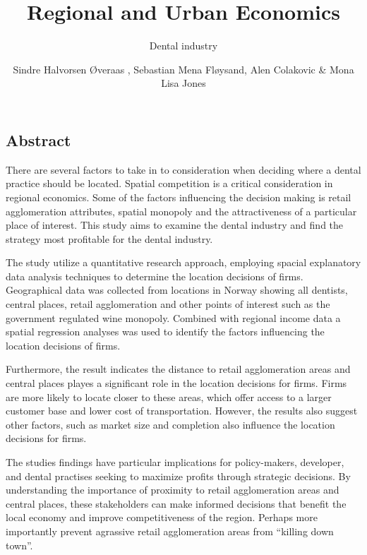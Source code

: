 \documentclass[
  10,
  a4paper,
]{article}
\title{Regional and Urban Economics}
\subtitle{Dental industry}
\author{Sindre Halvorsen Øveraas , Sebastian Mena Fløysand, Alen
Colakovic \& Mona Lisa Jones}
\date{}
\begin{document}
\maketitle
\ifdefined\Shaded\renewenvironment{Shaded}{\begin{tcolorbox}[borderline west={3pt}{0pt}{shadecolor}, enhanced, boxrule=0pt, frame hidden, interior hidden, breakable, sharp corners]}{\end{tcolorbox}}\fi

\hypertarget{abstract}{%
\subsection{Abstract}\label{abstract}}

There are several factors to take in to consideration when deciding
where a dental practice should be located. Spatial competition is a
critical consideration in regional economics. Some of the factors
influencing the decision making is retail agglomeration attributes,
spatial monopoly and the attractiveness of a particular place of
interest. This study aims to examine the dental industry and find the
strategy most profitable for the dental industry.

The study utilize a quantitative research approach, employing spacial
explanatory data analysis techniques to determine the location decisions
of firms. Geographical data was collected from locations in Norway
showing all dentists, central places, retail agglomeration and other
points of interest such as the government regulated wine monopoly.
Combined with regional income data a spatial regression analyses was
used to identify the factors influencing the location decisions of
firms.

Furthermore, the result indicates the distance to retail agglomeration
areas and central places playes a significant role in the location
decisions for firms. Firms are more likely to locate closer to these
areas, which offer access to a larger customer base and lower cost of
transportation. However, the results also suggest other factors, such as
market size and completion also influence the location decisions for
firms.

The studies findings have particular implications for policy-makers,
developer, and dental practises seeking to maximize profits through
strategic decisions. By understanding the importance of proximity to
retail agglomeration areas and central places, these stakeholders can
make informed decisions that benefit the local economy and improve
competitiveness of the region. Perhaps more importantly prevent
agrassive retail agglomeration areas from ``killing down town''.
\end{document}
